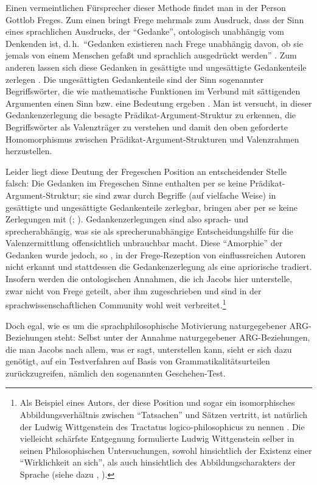 Einen vermeintlichen Fürsprecher dieser Methode findet man in der Person Gottlob Freges. Zum einen bringt Frege mehrmals zum Ausdruck, dass der Sinn eines sprachlichen Ausdrucks, der "`Gedanke"', ontologisch unabhängig vom Denkenden ist, d.\,h.\ "`Gedanken existieren nach Frege unabhängig davon, ob sie jemals von einem Menschen gefa\ss t und sprachlich ausgedrückt werden"' \citep[492]{Schirn:92}. Zum anderen lassen sich diese Gedanken in gesättigte und ungesättigte Gedankenteile zerlegen \citep[491]{Schirn:92}. Die ungesättigten Gedankenteile sind der Sinn sogenannter Begriffswörter, die wie mathematische Funktionen im Verbund mit sättigenden Argumenten einen Sinn bzw. eine Bedeutung ergeben \citep[476f]{Schirn:92}. Man ist versucht, in dieser Gedankenzerlegung die besagte Prädikat-Argument-Struktur zu erkennen, die Begriffswörter als Valenzträger zu verstehen und damit den oben geforderte Homomorphismus zwischen Prädikat-Argument-Strukturen und Valenzrahmen herzustellen. 

Leider liegt diese Deutung der Fregeschen Position an entscheidender Stelle falsch: Die Gedanken im Fregeschen Sinne enthalten per se keine Prädikat-Argument-Struktur; sie sind zwar durch Begriffe (auf vielfache Weise) in gesättigte und ungesättigte Gedankenteile zerlegbar, bringen aber per se keine Zerlegungen mit (\citealt{Kemmerling:90,Kemmerling:10}; \citealt[492]{Schirn:92}). Gedankenzerlegungen sind also sprach- und sprecherabhängig, was sie als sprecherunabhängige Entscheidungshilfe für die Valenzermittlung offensichtlich unbrauchbar macht. Diese "`Amorphie"' der Gedanken wurde jedoch, so \cite{Kemmerling:90}, in der Frege-Rezeption von einflussreichen Autoren nicht erkannt und stattdessen die Gedankenzerlegung als eine apriorische tradiert. Insofern werden die ontologischen Annahmen, die ich Jacobs hier unterstelle, zwar nicht von Frege geteilt, aber ihm zugeschrieben und sind in der sprachwissenschaftlichen Community wohl weit verbreitet.\footnote{Als Beispiel eines Autors, der diese Position und sogar ein isomorphisches Abbildungsverhältnis zwischen "`Tatsachen"' und Sätzen vertritt, ist natürlich der Ludwig Wittgenstein des Tractatus logico-philosophicus zu nennen \cite[53]{Kutschera:75}. Die vielleicht schärfste Entgegnung formulierte Ludwig Wittgenstein selber in seinen Philosophischen Untersuchungen, sowohl hinsichtlich der Existenz einer "`Wirklichkeit an sich"', als auch hinsichtlich des Abbildungscharakters der Sprache (siehe dazu \citealt[133]{Kutschera:75}, \citealt[22]{Ortner:87}).}

Doch egal, wie es um die sprachphilosophische Motivierung naturgegebener ARG-Bezie\-hun\-gen steht: Selbst unter der Annahme naturgegebener ARG-Bezie\-hun\-gen, die man Jacobs nach allem, was er sagt, unterstellen kann, sieht er sich dazu genötigt, auf ein Testverfahren auf Basis von Grammatikalitätsurteilen zurückzugreifen, nämlich den sogenannten Geschehen-Test.           



